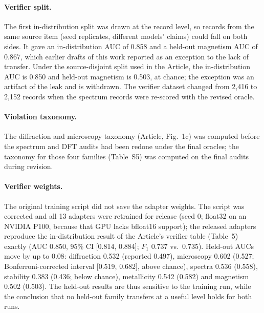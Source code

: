 \documentclass[11pt,a4paper]{article}
\begin{document}
\paragraph{Verifier split.} The first in-distribution split was drawn at the record level, so records
from the same source item (seed replicates, different models' claims) could fall on both sides. It
gave an in-distribution AUC of 0.858 and a held-out magnetism AUC of 0.867, which earlier drafts of
this work reported as an exception to the lack of transfer. Under the source-disjoint split used in the
Article, the in-distribution AUC is 0.850 and held-out magnetism is 0.503, at chance; the exception
was an artifact of the leak and is withdrawn. The verifier dataset changed from 2{,}416 to 2{,}152
records when the spectrum records were re-scored with the revised oracle.

\paragraph{Violation taxonomy.} The diffraction and microscopy taxonomy (Article, Fig.~1c) was
computed before the spectrum and DFT audits had been redone under the final oracles; the taxonomy
for those four families (Table~S5) was computed on the final audits during revision.

\paragraph{Verifier weights.} The original training script did not save the adapter weights. The
script was corrected and all 13 adapters were retrained for release (seed 0; float32 on an NVIDIA
P100, because that GPU lacks bfloat16 support); the released adapters reproduce the in-distribution result of the Article's verifier table (Table~5)
exactly (AUC 0.850, 95\% CI [0.814, 0.884]; $F_1$ 0.737 vs.\ 0.735). Held-out AUCs move by up to 0.08:
diffraction 0.532 (reported 0.497), microscopy 0.602 (0.527; Bonferroni-corrected interval
[0.519, 0.682], above chance), spectra 0.536 (0.558), stability 0.383 (0.436; below chance), metallicity
0.542 (0.582) and magnetism 0.502 (0.503). The held-out results are thus sensitive to the training run,
while the conclusion that no held-out family transfers at a useful level holds for both runs.


\end{document}
